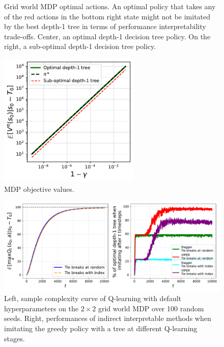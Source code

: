 \begin{figure}[h]
    \caption{Grid world MDP optimal actions. An optimal policy that takes any of the red actions in the bottom right state might not be imitated by the best depth-1 tree in terms of performance interpretability trade-offs.
    Center, an optimal depth-1 decision tree policy. On the right, a sub-optimal depth-1 decision tree policy.}
    \end{figure}

\begin{figure}
    \centering
    \includegraphics[width=0.6\textwidth]{images/images_part1/policy_values_comparison.pdf}
    \caption{MDP objective values.}\label{fig:objectives}
\end{figure}

\begin{figure}
    \centering
    \includegraphics[width=1\textwidth]{images/images_part1/base_mdp.pdf}
    \caption{Left, sample complexity curve of Q-learning with default hyperparameters on the $2\times 2$ grid world MDP over 100 random seeds. Right, performances of indirect interpretable methods when imitating the greedy policy with a tree at different Q-learning stages. }
\end{figure}

